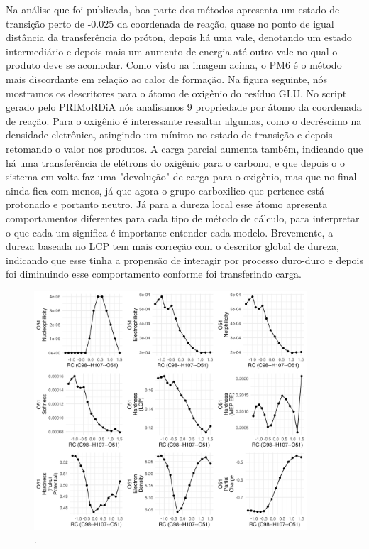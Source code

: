 \documentclass[a4paper,11pt]{refart}
\begin{document}
Na análise que foi publicada, boa parte dos métodos apresenta um estado de transição perto de -0.025 da coordenada de reação, quase no ponto de igual distância da transferência do próton, depois há uma vale, denotando um estado intermediário e depois mais um aumento de energia até outro vale no qual o produto deve se acomodar. Como visto na imagem acima, o PM6 é o método mais discordante em relação ao calor de formação. Na figura seguinte, nós mostramos os descritores para o átomo de oxigênio do resíduo GLU. No script gerado pelo PRIMoRDiA nós analisamos 9 propriedade por átomo da coordenada de reação. Para o oxigênio é interessante ressaltar algumas, como o decréscimo na densidade eletrônica, atingindo um mínimo no estado de transição e depois retomando o valor nos produtos. A carga parcial aumenta também, indicando que há uma transferência de elétrons do oxigênio para o carbono, e que depois o o sistema em volta faz uma "devolução" de carga para o oxigênio, mas que no final ainda fica com menos, já que agora o grupo carboxilico que pertence está protonado e portanto neutro. Já para a dureza local esse átomo apresenta comportamentos diferentes para cada tipo de método de cálculo, para interpretar o que cada um significa é importante entender cada modelo. Brevemente, a dureza baseada no LCP tem mais correção com o descritor global de dureza, indicando que esse tinha a propensão de interagir por processo duro-duro e depois foi diminuindo esse comportamento conforme foi transferindo carga. 


\hspace*{-\leftmarginwidth}
\begin{minipage}{\fullwidth}
	\begin{figure}[H]
		\begin{center}
			\includegraphics[width=4in]{images/tut6_img3}
			\caption{.}
			\label{fig_tut6_2}
		\end{center}
	\end{figure}
\end{minipage}
\end{document}
